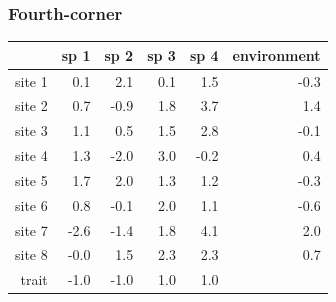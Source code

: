 \documentclass{beamer}
\numberwithin{exercise}{section}
\begin{document}
\begin{frame}
\frametitle{Fourth-corner}
\small
\begin{table}[ht]
\begin{center}
\begin{tabular}{r|rrrr|r|}
  & sp 1 & sp 2 & sp 3 & sp 4 & environment \\ 
  \hline
site 1 & 0.1 & 2.1 & 0.1 & 1.5 & -0.3 \\ 
  site 2 & 0.7 & -0.9 & 1.8 & 3.7 & 1.4 \\ 
  site 3 & 1.1 & 0.5 & 1.5 & 2.8 & -0.1 \\ 
  site 4 & 1.3 & -2.0 & 3.0 & -0.2 & 0.4 \\ 
  site 5 & 1.7 & 2.0 & 1.3 & 1.2 & -0.3 \\ 
  site 6 & 0.8 & -0.1 & 2.0 & 1.1 & -0.6 \\ 
  site 7 & -2.6 & -1.4 & 1.8 & 4.1 & 2.0 \\ 
  site 8 & -0.0 & 1.5 & 2.3 & 2.3 & 0.7 \\ 
   \hline
  trait & -1.0 & -1.0 & 1.0 & 1.0 &  \\ 
   \hline
\end{tabular}
\end{center}
\end{table}\normalsize 
\end{frame}
\end{document}
